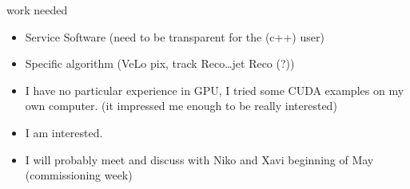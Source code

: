 \documentclass[compress,10pt]{beamer}
\begin{document}
\begin{frame}
   \begin{block}{work needed}
  \begin{itemize}
   \item Service Software (need to be transparent for the (c++) user)
   \item Specific algorithm (VeLo pix, track Reco\ldots jet Reco (?))
       \end{itemize}
   \end{block}
 \begin{block}{}
  \begin{itemize}
\item I have no particular experience in GPU, I tried some CUDA examples on my own computer. (it impressed me enough to be really interested)
\item I am interested.
\item I will probably meet and discuss with Niko and Xavi beginning of May (commissioning week)   \end{itemize}
   \end{block}
\end{frame}
\end{document}
